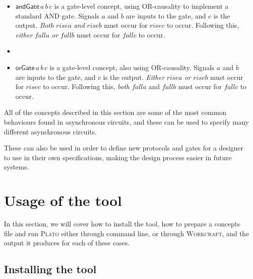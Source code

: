 \documentclass[british,conference,compsoc]{IEEEtran}
\newcommand{\noun}[1]{\textsc{#1}}
\begin{document}
\begin{itemize}
  \item $\mathsf{andGate}\,a\,b\,c$ is a gate-level concept, using 
  OR-causality to implement a standard AND gate. Signals $a$ and 
  $b$ are inputs to the gate, and $c$ is the output. \emph{Both} 
  $rise a$ \emph{and} $rise b$ must occur for $rise c$ to occur. 
  Following this, \emph{either} $fall a$ \emph{or} $fall b$ must 
  occur for $fall c$ to occur.
\vspace{-4mm}
  \item []  

  \item $\mathsf{orGate}\,a\,b\,c$ is a gate-level concept, also using 
  OR-causality. Signals $a$ and $b$ are inputs to the gate, and $c$ is the 
  output. \emph{Either} $rise a$ \emph{or} $rise b$ must occur for $rise c$ to 
  occur. Following this, \emph{both} $fall a$ and $fall b$ must occur for 
  $fall c$ to occur. 
  
\end{itemize}

\noindent All of the concepts described in this section are some of the most
common behaviours found in asynchronous circuits, and these can be used
to specify many different asynchronous circuits. 

These can also be used in order to define new protocols and gates for a designer
to use in their own specifications, making the design process easier in future 
systems. 

\vspace{-3mm}

\section{Usage of the tool\label{sec:tool-use}}

\vspace{-2mm}

In this section, we will cover how to install the tool, how to prepare a
concepts file and run \noun{Plato} either through command line, or through 
\noun{Workcraft}, and the output it produces for each of these cases.

\vspace{-2mm}

\subsection{Installing the tool \label{sub:installing}}

\vspace{-2mm}
\end{document}
